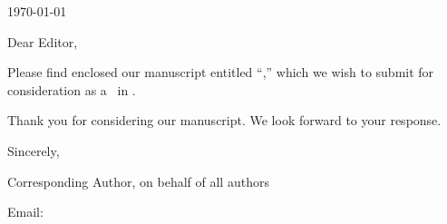 \documentclass[11pt]{article}
\begin{document}
\hfill\today\par
\EditorName\par
\EditorTitle\par
\textit{\JournalName}

Dear Editor,

Please find enclosed our manuscript entitled ``\ManuscriptTitle,'' which we
wish to submit for consideration as a \ArticleType\ in \textit{\JournalName}.


Thank you for considering our manuscript. We look forward to your response.

Sincerely,\par
\vspace{0.22in}

\begingroup
\setlength{\parskip}{2pt}
{\bfseries\CorrespondenceAuthorName}\par
Corresponding Author, on behalf of all authors\par
\CorrespondenceAuthorAffiliation\par
\CorrespondenceAuthorAddress\par
Email: \href{mailto:\CorrespondenceAuthorEmail}{\CorrespondenceAuthorEmail}
\endgroup
\end{document}
